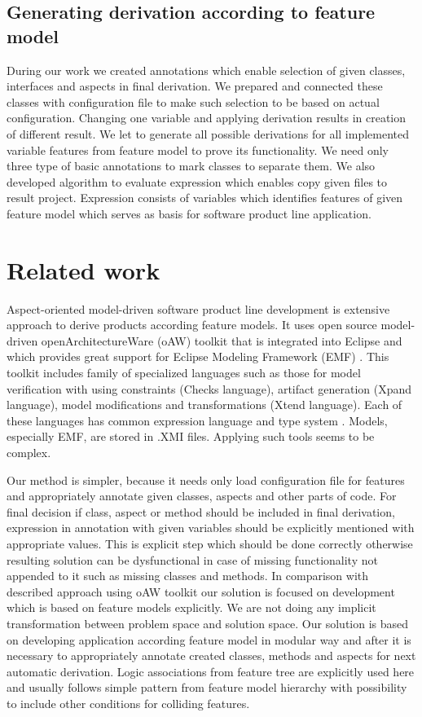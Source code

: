 \documentclass[11pt,english,a4paper,twoside]{article}
\begin{document}
\subsection{Generating derivation according to feature model} \label{gameDerivationBattleship}

During our work we created annotations which enable selection of given classes, interfaces and aspects in final derivation. We prepared and connected these classes with configuration file to make such selection to be based on actual configuration. Changing one variable and applying derivation results in creation of different result. We let to generate all possible derivations for all implemented variable features from feature model to prove its functionality. We need only three type of basic annotations to mark classes to separate them. We also developed algorithm to evaluate expression which enables copy given files to result project. Expression consists of variables which identifies features of given feature model which serves as basis for software product line application.    


\section{Related work} \label{recentWork}

Aspect-oriented model-driven software product line development is extensive approach to derive products according feature models. It uses open source model-driven openArchitectureWare (oAW) toolkit that is integrated into Eclipse and which provides great support for Eclipse Modeling Framework (EMF) \cite{voelter_product_2007}. This toolkit includes family of specialized languages such as those for model verification with using constraints (Checks language), artifact generation (Xpand language), model modifications and transformations (Xtend language). Each of these languages has common expression language and type system \cite{voelter_product_2007}. Models, especially EMF, are stored in .XMI files. Applying such tools seems to be complex. 

Our method is simpler, because it needs only load configuration file for features and appropriately annotate given classes, aspects and other parts of code. For final decision if class, aspect or method should be included in final derivation, expression in annotation with given variables should be explicitly mentioned with appropriate values. This is explicit step which should be done correctly otherwise resulting solution can be dysfunctional in case of missing functionality not appended to it such as missing classes and methods. In comparison with described approach using oAW toolkit our solution is focused on development which is based on feature models explicitly. We are not doing any implicit transformation between problem space and solution space. Our solution is based on developing application according feature model in modular way and after it is necessary to appropriately annotate created classes, methods and aspects for next automatic derivation. Logic associations from feature tree are explicitly used here and usually follows simple pattern from feature model hierarchy with possibility to include other conditions for colliding features.  
\end{document}
